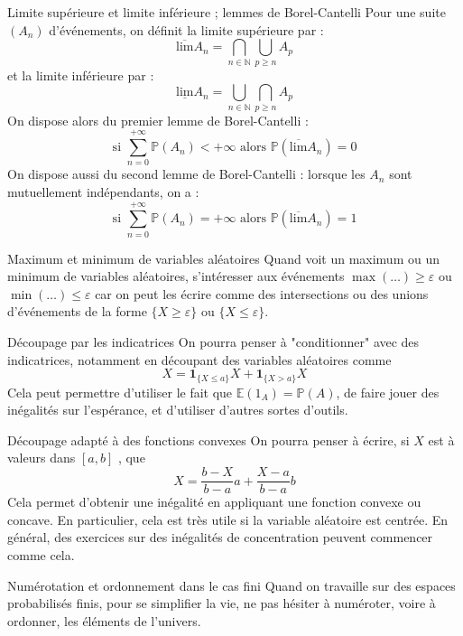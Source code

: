 \documentclass[french]{book}
\renewcommand{\P}{\mathbb{P}}
\newcommand{\N}{\mathbb{N}}
\newcommand{\E}{\mathbb{E}}
\theoremstyle{plain}
\theoremstyle{definition}
\theoremstyle{remark}
\begin{document}
\begin{AS}{Limite supérieure et limite inférieure ; lemmes de Borel-Cantelli} Pour une suite $(A_n)$ d'événements, on définit la limite supérieure par : $$\overline{\text{lim}}A_n=\bigcap_{n\in\N}\bigcup_{p\geqslant n}A_p$$ et la limite inférieure par : $$\underline{\text{lim}}A_n=\bigcup_{n\in\N}\bigcap_{p\geqslant n}A_p$$ On dispose alors du premier lemme de Borel-Cantelli : $$\text{si }\sum_{n=0}^{+\infty}\P(A_n)<+\infty\text{ alors }\P(\overline{\text{lim}}A_n)=0$$ On dispose aussi du second lemme de Borel-Cantelli : lorsque les $A_n$ sont mutuellement indépendants, on a : $$\text{si }\sum_{n=0}^{+\infty}\P(A_n)=+\infty\text{ alors }\P(\overline{\text{lim}}A_n)=1$$
\end{AS}

\begin{AS}{Maximum et minimum de variables aléatoires} Quand voit un maximum ou un minimum de variables aléatoires, s’intéresser
aux événements $\max(\ldots)\geqslant\varepsilon$ ou $\min(\ldots)\leqslant\varepsilon$ car on peut les écrire comme des
intersections ou des unions d’événements de la forme $\{X \geqslant \varepsilon\}$ ou $\{X \leqslant \varepsilon\}$.
\end{AS}

\begin{AS}{Découpage par les indicatrices} On pourra penser à "conditionner" avec des indicatrices, notamment en découpant des variables aléatoires comme $$X=\textbf{1}_{\{X\leqslant a\}}X+\textbf{1}_{\{X> a\}}X$$ Cela peut permettre d'utiliser le fait que $\E(1_A)=\P(A)$, de faire jouer des inégalités sur l'espérance, et d'utiliser d'autres sortes d'outils.
\end{AS}

\begin{AS}{Découpage adapté à des fonctions convexes} On pourra penser à écrire, si $X$ est à valeurs dans $[a,b]$ , que $$X=\frac{b-X}{b-a}a+\frac{X-a}{b-a}b$$ Cela permet d'obtenir une inégalité en appliquant une fonction convexe ou concave. En particulier, cela est très utile si la variable aléatoire est centrée. En général, des exercices sur des inégalités de concentration peuvent commencer comme cela.
\end{AS}

\begin{AS}{Numérotation et ordonnement dans le cas fini} Quand on travaille sur des espaces probabilisés finis, pour se simplifier la vie, ne pas hésiter à
numéroter, voire à ordonner, les éléments de l'univers.
\end{AS}
\end{document}
